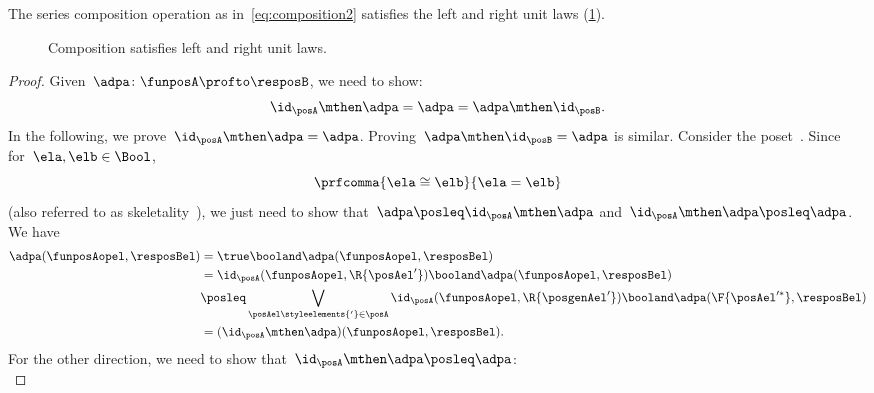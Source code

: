 \begin{lemma}
    \label{lem:compositionunital}
    The series composition operation as in~\cref{eq:composition2} satisfies the left and right unit laws (\cref{fig:compositionunital}).
\end{lemma}
\begin{figure}[h!]
    \centering
    \caption{Composition satisfies left and right unit laws.} \label{fig:compositionunital}
\end{figure}
\begin{proof}
    Given~$\adpa\colon \funposA\profto \resposB$, we need to show:
    \begin{equation*}
        \id_\posA \mthen \adpa= \adpa = \adpa\mthen \id_\posB.
    \end{equation*}
    In the following, we prove~$\id_\posA \mthen \adpa = \adpa$.
    Proving~$\adpa\mthen \id_\posB=\adpa$ is similar.
    Consider the poset~\Bool.
    Since for~$\ela,\elb\in \Bool$,
    \begin{equation*}
        \prfcomma{
            \ela\cong \elb
        }{
            \ela=\elb
        }
    \end{equation*}
    (also referred to as skeletality~\cite{fong2019}), we just need to show that~$\adpa\posleq \id_\posA\mthen \adpa$ and~$\id_\posA\mthen \adpa\posleq \adpa$.
    We have
    \begin{equation*}
        \label{eq:dp_unit_1}
        \begin{aligned}
            \adpa(\funposAopel,\resposBel) & =\true \booland \adpa(\funposAopel,\resposBel)                                                                                       \\
                                           & = \id_\posA(\funposAopel,\R{\posAel'}) \booland \adpa(\funposAopel,\resposBel)                                                       \\
                                           & \posleq \bigvee_{\posAel\styleelements{'} \in \posA}\id_\posA(\funposAopel,\R{\posgenAel'})\booland \adpa(\F{\posAel'^*},\resposBel) \\
                                           & =(\id_\posA\mthen \adpa)(\funposAopel,\resposBel).
        \end{aligned}
    \end{equation*}
    For the other direction, we need to show that~$\id_\posA\mthen \adpa\posleq \adpa$:
    \begin{equation*}
        \label{eq:dp_unit_2}

\end{equation*}
\end{proof}
